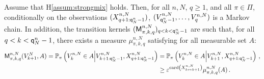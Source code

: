 \begin{lemma}
\label{lem:minorization}
Assume that H\ref{assum:strongmix} holds. Then, for all $n,N$, $q\ge 1$, and all $\pi\in\Pi$, conditionally on the observations $(X_{q+1:{\mathsf{q}}^{n}_{N}-1}^{n,N})$, $(V_{{\mathsf{q}}^{n}_{N}-1}^{n,N},\ldots,V_q^{n,N})$ is a Markov chain.
In addition,  the transition kernels $(\mathsf{M}^{n,N}_{\pi,k,q})_{q< k <{\mathsf{q}}^{n}_{N}-1}$ are such that, for all $q< k < {\mathsf{q}}^{n}_{N}-1$, there exists a measure $\mu^{n,N}_{\pi,k,q}$ satisfying for all measurable set $A$:
\begin{align*}
\mathsf{M}^{n,N}_{\pi,k,q}(V^N_{k+1},A) = \mathbb{P}_{\pi}\left(V^{n,N}_{k}\in A\middle|V^{n,N}_{k+1:{\mathsf{q}}^{n}_{N}-1},X_{q+1:{\mathsf{q}}^{n}_{N}-1}^{n,N}\right)  &= \mathbb{P}_{\pi}\left(V^{n,N}_{k}\in A\middle|V^{n,N}_{k+1},X_{q+1:{\mathsf{q}}^{n}_{N}-1}^{n,N}\right)\,,\\
&\ge \varepsilon^{\mathrm{card}\left(X^{n,N}_{k\leftrightarrow k+1}\right)} \mu^{n,N}_{\pi,k,q}(A)\,.
\end{align*}
\end{lemma}
